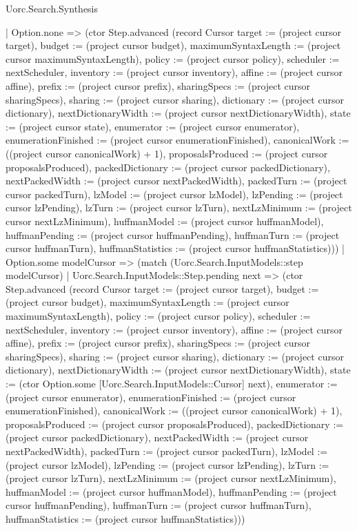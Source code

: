\begin{lexlean}{Uorc.Search.Synthesis}
\begin{semanticmodule}
{        | Option.none => (ctor Step.advanced (record Cursor {target := (project cursor target), budget := (project cursor budget), maximumSyntaxLength := (project cursor maximumSyntaxLength), policy := (project cursor policy), scheduler := nextScheduler, inventory := (project cursor inventory), affine := (project cursor affine), prefix := (project cursor prefix), sharingSpecs := (project cursor sharingSpecs), sharing := (project cursor sharing), dictionary := (project cursor dictionary), nextDictionaryWidth := (project cursor nextDictionaryWidth), state := (project cursor state), enumerator := (project cursor enumerator), enumerationFinished := (project cursor enumerationFinished), canonicalWork := ((project cursor canonicalWork) + 1), proposalsProduced := (project cursor proposalsProduced), packedDictionary := (project cursor packedDictionary), nextPackedWidth := (project cursor nextPackedWidth), packedTurn := (project cursor packedTurn), lzModel := (project cursor lzModel), lzPending := (project cursor lzPending), lzTurn := (project cursor lzTurn), nextLzMinimum := (project cursor nextLzMinimum), huffmanModel := (project cursor huffmanModel), huffmanPending := (project cursor huffmanPending), huffmanTurn := (project cursor huffmanTurn), huffmanStatistics := (project cursor huffmanStatistics)}))
        | Option.some modelCursor => (match (Uorc.Search.InputModels::step modelCursor)
          | Uorc.Search.InputModels::Step.pending next => (ctor Step.advanced (record Cursor {target := (project cursor target), budget := (project cursor budget), maximumSyntaxLength := (project cursor maximumSyntaxLength), policy := (project cursor policy), scheduler := nextScheduler, inventory := (project cursor inventory), affine := (project cursor affine), prefix := (project cursor prefix), sharingSpecs := (project cursor sharingSpecs), sharing := (project cursor sharing), dictionary := (project cursor dictionary), nextDictionaryWidth := (project cursor nextDictionaryWidth), state := (ctor Option.some [Uorc.Search.InputModels::Cursor] next), enumerator := (project cursor enumerator), enumerationFinished := (project cursor enumerationFinished), canonicalWork := ((project cursor canonicalWork) + 1), proposalsProduced := (project cursor proposalsProduced), packedDictionary := (project cursor packedDictionary), nextPackedWidth := (project cursor nextPackedWidth), packedTurn := (project cursor packedTurn), lzModel := (project cursor lzModel), lzPending := (project cursor lzPending), lzTurn := (project cursor lzTurn), nextLzMinimum := (project cursor nextLzMinimum), huffmanModel := (project cursor huffmanModel), huffmanPending := (project cursor huffmanPending), huffmanTurn := (project cursor huffmanTurn), huffmanStatistics := (project cursor huffmanStatistics)}))
}
\end{semanticmodule}
\end{lexlean}
